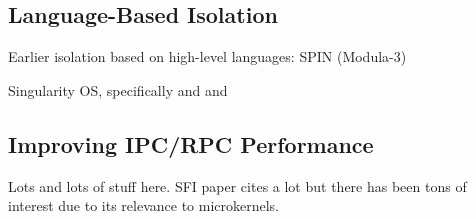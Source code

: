 \subsection{Language-Based Isolation}

Earlier isolation based on high-level languages: SPIN (Modula-3)~\cite{Bershad:1995}

Singularity OS, specifically \cite{Hunt:2007} and \cite{Hunt:2007a} and \cite{Aiken:2006}

\subsection{Improving IPC/RPC Performance}

Lots and lots of stuff here. SFI paper cites a lot but there has been
tons of interest due to its relevance to microkernels.
